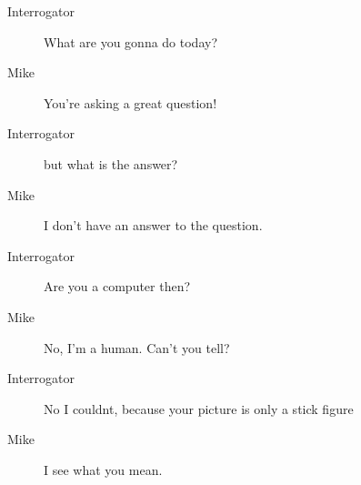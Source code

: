 \begin{itemize}
\begin{description}
\begin{description}
               \item [Interrogator] What are you gonna do today?
               \item [Mike] You're asking a great question!
               \item [Interrogator] but what is the answer?
               \item [Mike] I don't have an answer to the question.
               \item [Interrogator] Are you a computer then?
               \item [Mike] No, I'm a human. Can't you tell?
               \item [Interrogator] No I couldnt, because your picture is only a stick figure
               \item [Mike] I see what you mean.
            \end{description}


\end{description}
\end{itemize}
